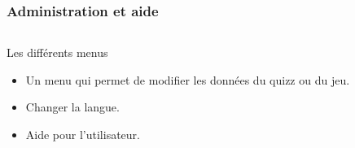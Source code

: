 \begin{frame}
  \frametitle{Administration et aide}
 \begin{columns}[t]
    \begin{column}{10cm}
      \begin{exampleblock}{Les différents menus}
	\begin{itemize}
        \item Un menu qui permet de modifier les données du quizz ou du jeu.
        \item Changer la langue.
        \item Aide pour l'utilisateur.
        \end{itemize}
      \end{exampleblock} 
    \end{column}
  \end{columns}  
\end{frame}

